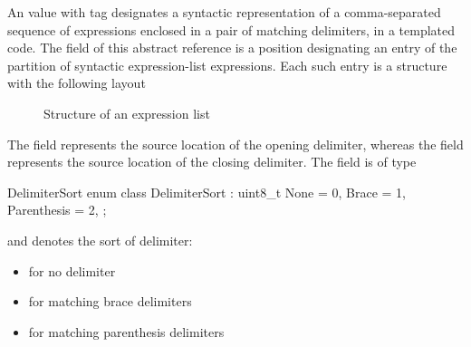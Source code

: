 An  value with tag  designates a syntactic representation
of a comma-separated sequence of expressions enclosed in a pair of matching delimiters, in a templated code.
The  field of this abstract reference is a position designating an entry of the partition of
syntactic expression-list expressions.  Each such entry is a structure with the following layout
%
\begin{figure}[H]
	\centering
	\caption{Structure of an expression list}
	\label{fig:ifc:ExprSort:ExpressionList}
\end{figure}
%
The  field represents the source location of the opening delimiter, whereas the 
field represents the source location of the closing delimiter.
The  field is of type
\begin{typedef}{DelimiterSort}{}
	enum class DelimiterSort : uint8_t {
		None = 0,
		Brace = 1,
		Parenthesis = 2,
	};
\end{typedef}
and denotes the sort of delimiter:
\begin{itemize}
	\item {} for no delimiter
	\item {} for matching brace delimiters
	\item {} for matching parenthesis delimiters
\end{itemize}




\subsection{}
\label{sec:ifc:ExprSort:SizeofType}

